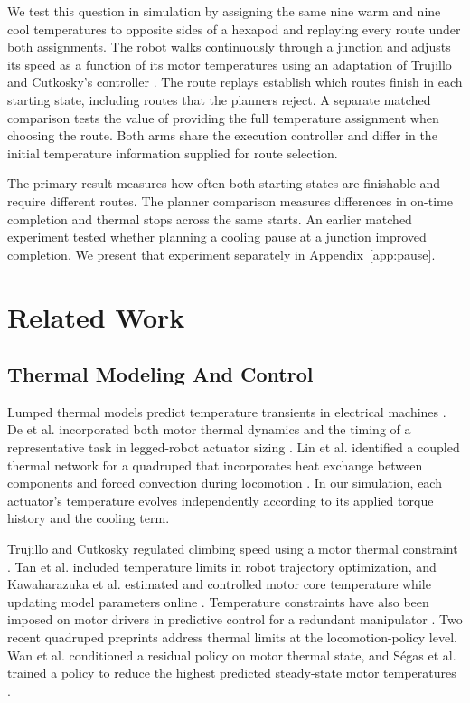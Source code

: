 \documentclass{ieeeaccess}
\begin{document}
We test this question in simulation by assigning the same nine warm and nine cool temperatures to opposite sides of a hexapod and replaying every route under both assignments. The robot walks continuously through a junction and adjusts its speed as a function of its motor temperatures using an adaptation of Trujillo and Cutkosky's controller \cite{trujillo2009}. The route replays establish which routes finish in each starting state, including routes that the planners reject. A separate matched comparison tests the value of providing the full temperature assignment when choosing the route. Both arms share the execution controller and differ in the initial temperature information supplied for route selection.

The primary result measures how often both starting states are finishable and require different routes. The planner comparison measures differences in on-time completion and thermal stops across the same starts. An earlier matched experiment tested whether planning a cooling pause at a junction improved completion. We present that experiment separately in Appendix~\ref{app:pause}.

\section{Related Work}

\subsection{Thermal Modeling And Control}

Lumped thermal models predict temperature transients in electrical machines \cite{mellor1991}. De et al. incorporated both motor thermal dynamics and the timing of a representative task in legged-robot actuator sizing \cite{de2011}. Lin et al. identified a coupled thermal network for a quadruped that incorporates heat exchange between components and forced convection during locomotion \cite{lin2025}. In our simulation, each actuator's temperature evolves independently according to its applied torque history and the cooling term.

Trujillo and Cutkosky regulated climbing speed using a motor thermal constraint \cite{trujillo2009}. Tan et al. included temperature limits in robot trajectory optimization, and Kawaharazuka et al. estimated and controlled motor core temperature while updating model parameters online \cite{tan2018heat,kawaharazuka2020}. Temperature constraints have also been imposed on motor drivers in predictive control for a redundant manipulator \cite{debenedittis2026}. Two recent quadruped preprints address thermal limits at the locomotion-policy level. Wan et al. conditioned a residual policy on motor thermal state, and Ségas et al. trained a policy to reduce the highest predicted steady-state motor temperatures \cite{wan2026,segas2026}.
\end{document}
